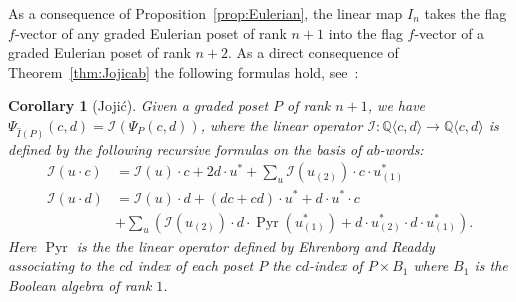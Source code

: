 \documentclass[reqno,12pt]{amsart}
\numberwithin{equation}{section}
\newtheorem{corollary}[theorem]{Corollary}
\newcommand{\0}{\widehat{0}}
\newcommand{\1}{\widehat{1}}
\newcommand{\2}{\widehat{2}}
\newcommand{\grI}{\widehat{I}}
\newcommand{\Iab}{{\mathcal I}}
\begin{document}
As a consequence of Proposition~\ref{prop:Eulerian}, the linear map $I_n$
takes the flag $f$-vector of any graded Eulerian poset of rank $n+1$
into the flag $f$-vector of a graded Eulerian poset of rank $n+2$. As a
direct consequence of Theorem~\ref{thm:Jojicab} the following formulas 
hold, see~\cite[Corollary 7]{Jojic}:
\begin{corollary}[Joji\'{c}]
\label{cor:Jojiccd}
Given a graded poset $P$ of rank $n+1$, we have
$\Psi_{\grI(P)}(c,d)=\Iab(\Psi_{P}(c,d))$, where the linear operator
$\Iab: {\mathbb Q}\langle c,d\rangle \rightarrow {\mathbb Q}\langle c,d\rangle$
is defined by the following recursive formulas on the basis of
$ab$-words:
\begin{align*}
\Iab(u\cdot c)&=\Iab(u)\cdot c+2d\cdot u^* +\sum_{u}
\Iab(u_{(2)})\cdot c\cdot u_{(1)}^*\\
\Iab(u\cdot d)&=\Iab(u)\cdot d+(dc+cd)\cdot u^*+d\cdot u^*\cdot c\\
&+\sum_{u}
(\Iab(u_{(2)})\cdot d\cdot \operatorname{Pyr}(u_{(1)}^*)+d\cdot
u_{(2)}^*\cdot d\cdot u_{(1)}^*).
\end{align*}  
Here $\operatorname{Pyr}$ is the the linear operator defined by
Ehrenborg and Readdy~\cite{Ehrenborg-Readdy-cop} associating to the $cd$
index of each poset $P$ the $cd$-index of $P\times B_1$ where $B_1$ is
the Boolean algebra of rank $1$. 
\end{corollary}
\end{document}
